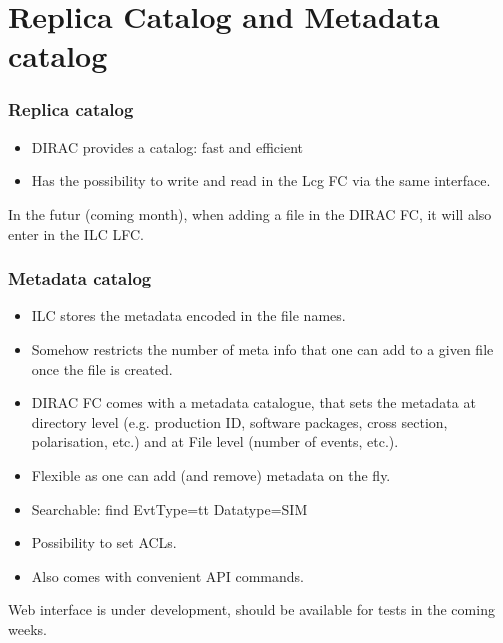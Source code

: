 \documentclass{beamer}
\begin{document}
\section{Replica Catalog and Metadata catalog}
\begin{frame}
\frametitle{Replica catalog} 
\begin{itemize}
\item \alert{DIRAC provides a catalog}: fast and efficient
\item Has the possibility to \alert{write and read in the Lcg FC via the same interface}.
\end{itemize}
In the futur (coming month), when adding a file in the DIRAC FC, it will also enter in the ILC LFC.
 \end{frame}
{
\begin{frame}
\frametitle{Metadata catalog}
\begin{itemize}
\item ILC stores the metadata encoded in the file names.
\item Somehow restricts the number of meta info that one can add to a given file once the file is created.
\item DIRAC FC comes with a metadata catalogue, that sets the \alert{metadata at directory level} (e.g. production ID, software packages, cross section, polarisation, etc.) and at File level (number of events, etc.).
\item Flexible as one can add (and remove) metadata on the fly.
\item Searchable: find EvtType=tt Datatype=SIM
\item Possibility to set ACLs.
\item Also comes with convenient API commands.
\end{itemize} 
Web interface is under development, should be available for tests in the coming weeks.
 \end{frame}
}
\end{document}
